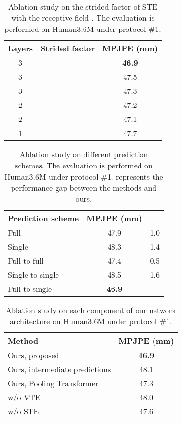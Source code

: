 \documentclass[journal]{IEEEtran}
\begin{document}
\begin{table}[tb]
   \caption
   {
      Ablation study on the strided factor of STE with the receptive field . 
      The evaluation is performed on Human3.6M under protocol \#1.
   }
   \centering  
   \setlength{\tabcolsep}{7.50mm} 
   \begin{tabular}{ccc}
   \toprule  [1pt]
   Layers &Strided factor &MPJPE (mm)  \\
   \midrule  [0.5pt]  
   3 & &\textbf{46.9} \\
   3 & &47.5  \\
   3 & &47.3 \\
   2 & &47.2  \\
   2 & &47.1  \\
   1 & &47.7 \\
   \toprule [1pt]
   \end{tabular}
   \label{table:Strided}
\end{table}

\begin{table}[tb]
   \caption
   {
      Ablation study on different prediction schemes. 
      The evaluation is performed on Human3.6M under protocol \#1.
       represents the performance gap between the methods and ours.
   }
   \centering  
   \setlength{\tabcolsep}{7.30mm} 
   \begin{tabular}{lcc}
   \toprule  [1pt]
   Prediction scheme &MPJPE (mm) & \\
   \midrule [0.5pt]
   Full &47.9 &1.0 \\
   Single &48.3 &1.4 \\
   Full-to-full &47.4 &0.5 \\
   Single-to-single &48.5 &1.6 \\
   Full-to-single &\textbf{46.9} &- \\
   \toprule [1pt]
   \end{tabular}
   \label{table:prediction}
\end{table}

\begin{table}[!htb]
   \centering
   \caption
   {
      Ablation study on each component of our network architecture on Human3.6M under protocol \#1.
   }
   \setlength{\tabcolsep}{8.35mm} 
   
   \begin{tabular}{lc}
   \toprule [1.0pt] 
   Method& MPJPE (mm) \\
   \midrule [0.5pt] 
   Ours, proposed &\textbf{46.9} \\
   Ours, intermediate predictions &48.1 \\
   Ours, Pooling Transformer &47.3 \\
   \midrule [0.5pt]

   w/o VTE &48.0 \\
   w/o STE &47.6 \\
   \toprule [1.0pt] 
   \end{tabular}
   \label{table:ablation_method}
\end{table}
\end{document}
